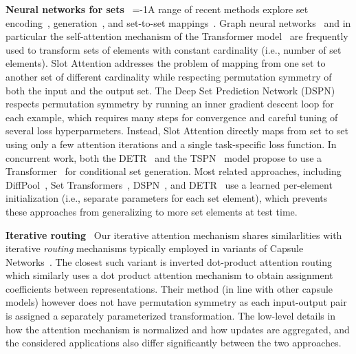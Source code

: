 \documentclass{article}
\newcommand{\sam}[0]{Slot Attention\xspace}
\begin{document}
\textbf{Neural networks for sets} \
\looseness=-1A range of recent methods explore set encoding~\citep{lin2017structured,zaheer2017deep,zhang2019fspool}, generation~\citep{zhang2019deep,rezatofighi2020learn}, and set-to-set mappings~\citep{vaswani2017attention,lee2018set}. Graph neural networks~\citep{scarselli2008graph,li2015gated,kipf2016semi,battaglia2018relational} and in particular the self-attention mechanism of the Transformer model~\citep{vaswani2017attention} are frequently used to transform sets of elements with constant cardinality (i.e., number of set elements). Slot Attention addresses the problem of mapping from one set to another set of different cardinality while respecting permutation symmetry of both the input and the output set. The Deep Set Prediction Network (DSPN)~\citep{zhang2019deep,huang2020set} respects permutation symmetry by running an inner gradient descent loop for each example, which requires many steps for convergence and careful tuning of several loss hyperparmeters. Instead, \sam directly maps from set to set using only a few attention iterations and a single task-specific loss function. In concurrent work, both the DETR~\citep{carion2020detr} and the TSPN~\citep{kosiorek2020conditional} model propose to use a Transformer~\citep{vaswani2017attention} for conditional set generation. Most related approaches, including DiffPool~\citep{ying2018hierarchical}, Set Transformers~\citep{lee2018set}, DSPN~\citep{zhang2019deep}, and DETR~\citep{carion2020detr} use a learned per-element initialization (i.e., separate parameters for each set element), which prevents these approaches from generalizing to more set elements at test time.

\textbf{Iterative routing} \
Our iterative attention mechanism shares similarlities with iterative \textit{routing} mechanisms typically employed in variants of Capsule Networks~\citep{sabour2017dynamic, hinton2018matrix,tsai2020capsules}. The closest such variant is inverted dot-product attention routing~\citep{tsai2020capsules} which similarly uses a dot product attention mechanism to obtain assignment coefficients between representations. Their method (in line with other capsule models) however does not have permutation symmetry as each input-output pair is assigned a separately parameterized transformation. The low-level details in how the attention mechanism is normalized and how updates are aggregated, and the considered applications also differ significantly between the two approaches.
\end{document}
